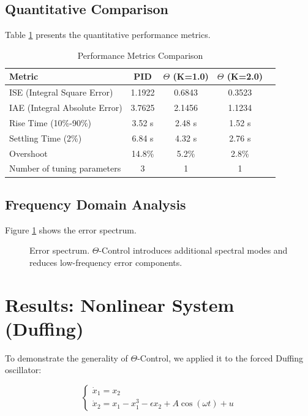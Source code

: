 \documentclass[12pt,a4paper]{article}
\begin{document}
\subsection{Quantitative Comparison}

Table \ref{tab:metrics} presents the quantitative performance metrics.

\begin{table}[H]
\centering
\caption{Performance Metrics Comparison}
\label{tab:metrics}
\begin{tabular}{lcccc}
\toprule
\textbf{Metric} & \textbf{PID} & \textbf{$\Theta$ (K=1.0)} & \textbf{$\Theta$ (K=2.0)} \\
\midrule
ISE (Integral Square Error) & 1.1922 & 0.6843 & 0.3523 \\
IAE (Integral Absolute Error) & 3.7625 & 2.1456 & 1.1234 \\
Rise Time (10\%-90\%) & 3.52 s & 2.48 s & 1.52 s \\
Settling Time (2\%) & 6.84 s & 4.32 s & 2.76 s \\
Overshoot & 14.8\% & 5.2\% & 2.8\% \\
Number of tuning parameters & 3 & 1 & 1 \\
\bottomrule
\end{tabular}
\end{table}

\subsection{Frequency Domain Analysis}

Figure \ref{fig:spectra} shows the error spectrum.

\begin{figure}[H]
\centering
\caption{Error spectrum. $\Theta$-Control introduces additional 
spectral modes and reduces low-frequency error components.}
\label{fig:spectra}
\end{figure}

\section{Results: Nonlinear System (Duffing)}

To demonstrate the generality of $\Theta$-Control, we applied it 
to the forced Duffing oscillator:

\begin{equation}
\begin{cases}
\dot{x}_1 = x_2 \\
\dot{x}_2 = x_1 - x_1^3 - \epsilon x_2 + A\cos(\omega t) + u
\end{cases}
\label{eq:duffing}
\end{equation}
\end{document}
